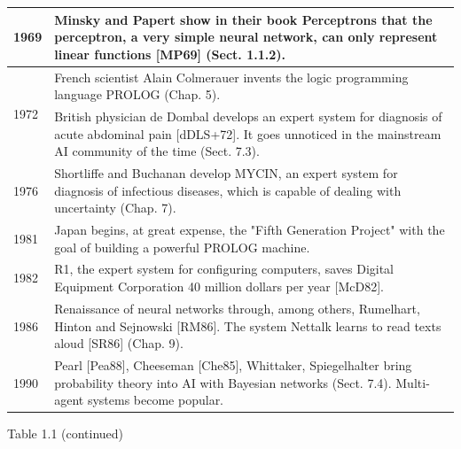 \documentclass[10pt]{book}
\begin{document}
\begin{center}
\begin{tabular}{|l|l|}
\hline
1969 & Minsky and Papert show in their book Perceptrons that the perceptron, a very simple neural network, can only represent linear functions [MP69] (Sect. 1.1.2). \\
\hline
\multirow[t]{2}{*}{1972} & French scientist Alain Colmerauer invents the logic programming language PROLOG (Chap. 5). \\
\hline
 & British physician de Dombal develops an expert system for diagnosis of acute abdominal pain [dDLS+72]. It goes unnoticed in the mainstream AI community of the time (Sect. 7.3). \\
\hline
1976 & Shortliffe and Buchanan develop MYCIN, an expert system for diagnosis of infectious diseases, which is capable of dealing with uncertainty (Chap. 7). \\
\hline
1981 & Japan begins, at great expense, the "Fifth Generation Project" with the goal of building a powerful PROLOG machine. \\
\hline
1982 & R1, the expert system for configuring computers, saves Digital Equipment Corporation 40 million dollars per year [McD82]. \\
\hline
1986 & Renaissance of neural networks through, among others, Rumelhart, Hinton and Sejnowski [RM86]. The system Nettalk learns to read texts aloud [SR86] (Chap. 9). \\
\hline
1990 & Pearl [Pea88], Cheeseman [Che85], Whittaker, Spiegelhalter bring probability theory into AI with Bayesian networks (Sect. 7.4). Multi-agent systems become popular. \\
\hline
\end{tabular}
\end{center}

Table 1.1 (continued)
\end{document}
